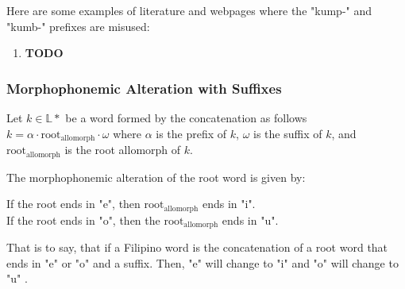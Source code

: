 \begin{example}
    Here are some examples of literature and webpages where the "kump-" and "kumb-"
    prefixes are misused:
\end{example}
\begin{enumerate}
    \item \textbf{TODO}
\end{enumerate}

\subsubsection{Morphophonemic Alteration with Suffixes}

Let \(k \in \mathbb{L}*\) be a word formed by the concatenation as follows
\(k = \alpha \cdot \text{root}_\text{allomorph} \cdot \omega \)
where  \(\alpha\) is the prefix of \(k\), \(\omega\) is the suffix of \(k\),
and \(\text{root}_\text{allomorph}\) is the root allomorph of \(k\).

The morphophonemic alteration of the root word is given by:
\begin{center}
    If the root ends in "e", then \(\text{root}_\text{allomorph}\) ends in "i". \\
    If the root ends in "o", then the \(\text{root}_\text{allomorph}\) ends in "u".
\end{center}

That is to say, that if a Filipino word is the concatenation of a root word that
ends in "e" or "o" and a suffix. Then, "e" will change to "i" and "o" will change
to "u" \cite{Yap_1967}.

